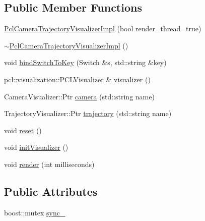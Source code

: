 \subsection*{Public Member Functions}
\begin{DoxyCompactItemize}
\item 
\mbox{\hyperlink{structdvo_1_1visualization_1_1internal_1_1_pcl_camera_trajectory_visualizer_impl_ac27a7fde4cc28672ebb5e65f80eb8865}{Pcl\+Camera\+Trajectory\+Visualizer\+Impl}} (bool render\+\_\+thread=true)
\item 
\mbox{\hyperlink{structdvo_1_1visualization_1_1internal_1_1_pcl_camera_trajectory_visualizer_impl_a3a8627e770ee2c18d07e79f921e60d16}{$\sim$\+Pcl\+Camera\+Trajectory\+Visualizer\+Impl}} ()
\item 
void \mbox{\hyperlink{structdvo_1_1visualization_1_1internal_1_1_pcl_camera_trajectory_visualizer_impl_a21c3f13d2d5ccb2f2913a08a421cd7fd}{bind\+Switch\+To\+Key}} (Switch \&s, std\+::string \&key)
\item 
pcl\+::visualization\+::\+P\+C\+L\+Visualizer \& \mbox{\hyperlink{structdvo_1_1visualization_1_1internal_1_1_pcl_camera_trajectory_visualizer_impl_a28159937aa1551faf546b827eddb3f44}{visualizer}} ()
\item 
Camera\+Visualizer\+::\+Ptr \mbox{\hyperlink{structdvo_1_1visualization_1_1internal_1_1_pcl_camera_trajectory_visualizer_impl_a1834a57c67d10cbeac37362c546d3575}{camera}} (std\+::string name)
\item 
Trajectory\+Visualizer\+::\+Ptr \mbox{\hyperlink{structdvo_1_1visualization_1_1internal_1_1_pcl_camera_trajectory_visualizer_impl_a603eeb0964ce83fff1e736003177661c}{trajectory}} (std\+::string name)
\item 
void \mbox{\hyperlink{structdvo_1_1visualization_1_1internal_1_1_pcl_camera_trajectory_visualizer_impl_a3b1dc7581be3c4e278d0a60678be494e}{reset}} ()
\item 
void \mbox{\hyperlink{structdvo_1_1visualization_1_1internal_1_1_pcl_camera_trajectory_visualizer_impl_a79a0458c9c30be3b18f9cbc3a0d4002f}{init\+Visualizer}} ()
\item 
void \mbox{\hyperlink{structdvo_1_1visualization_1_1internal_1_1_pcl_camera_trajectory_visualizer_impl_ae2b0083367d0b2955cf2f7adb18a1acb}{render}} (int milliseconds)
\end{DoxyCompactItemize}
\subsection*{Public Attributes}
\begin{DoxyCompactItemize}
\item 
boost\+::mutex \mbox{\hyperlink{structdvo_1_1visualization_1_1internal_1_1_pcl_camera_trajectory_visualizer_impl_add80c1ad58f55ec00c2ad0d08c0aaaac}{sync\+\_\+}}
\end{DoxyCompactItemize}


